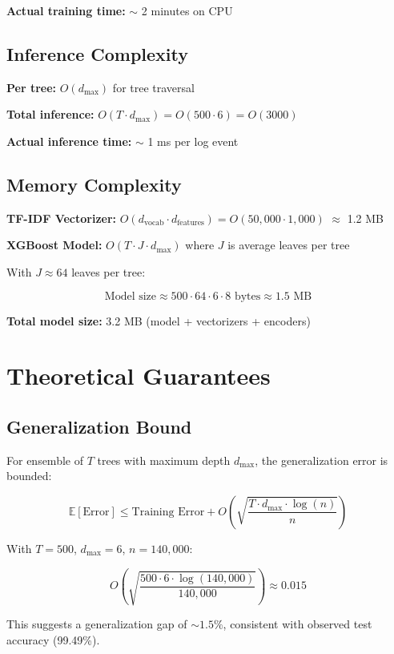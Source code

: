 \documentclass[12pt,a4paper]{article}
\begin{document}
\textbf{Actual training time:} $\sim$ 2 minutes on CPU

\subsection{Inference Complexity}

\textbf{Per tree:} $O(d_{\text{max}})$ for tree traversal

\textbf{Total inference:} $O(T \cdot d_{\text{max}}) = O(500 \cdot 6) = O(3000)$

\textbf{Actual inference time:} $\sim$ 1 ms per log event

\subsection{Memory Complexity}

\textbf{TF-IDF Vectorizer:} $O(d_{\text{vocab}} \cdot d_{\text{features}}) = O(50{,}000 \cdot 1{,}000)$ $\approx$ 1.2 MB

\textbf{XGBoost Model:} $O(T \cdot J \cdot d_{\text{max}})$ where $J$ is average leaves per tree

With $J \approx 64$ leaves per tree:

$$\text{Model size} \approx 500 \cdot 64 \cdot 6 \cdot 8 \text{ bytes} \approx 1.5 \text{ MB}$$

\textbf{Total model size:} 3.2 MB (model + vectorizers + encoders)

\section{Theoretical Guarantees}

\subsection{Generalization Bound}

For ensemble of $T$ trees with maximum depth $d_{\text{max}}$, the generalization error is bounded:

$$\mathbb{E}[\text{Error}] \leq \text{Training Error} + O\left(\sqrt{\frac{T \cdot d_{\text{max}} \cdot \log(n)}{n}}\right)$$

With $T = 500$, $d_{\text{max}} = 6$, $n = 140{,}000$:

$$O\left(\sqrt{\frac{500 \cdot 6 \cdot \log(140{,}000)}{140{,}000}}\right) \approx 0.015$$

This suggests a generalization gap of $\sim 1.5\%$, consistent with observed test accuracy (99.49\%).
\end{document}
